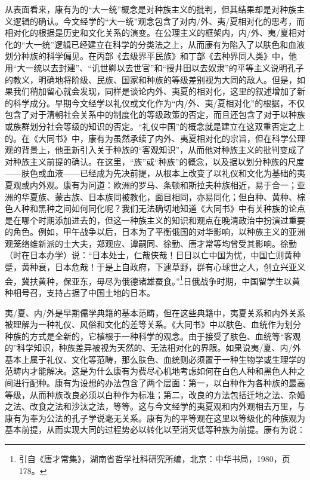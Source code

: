 \documentclass[a4paper, 12pt, openright]{ctexbook}
\begin{document}
从表面看来，康有为的“大一统”概念是对种族主义的批判，但其结果却是对种族主义逻辑的确认。今文经学的“大一统”观念包含了对内/外、夷/夏相对化的思考，而相对化的根据是历史和文化关系的演变。在公理主义的框架内，内/外、夷/夏相对化的“大一统”逻辑已经建立在科学的分类法之上，从而康有为陷入了以肤色和血液划分种族的科学偏见。在丙部《去级界平民族》和丁部《去种界同人类》中，他用“大一统以去封建”、“讥世卿以去世官”和“授井田以去奴隶”的平等主义说明孔子的教义，明确地将阶级、民族、国家和种族的等级差别视为大同的敌人。但是，如果我们稍加留心就会发现，同样是谈论内外、夷夏的相对化，这里的叙述增加了新的科学成分。早期今文经学以礼仪或文化作为“内/外、夷/夏相对化”的根据，不仅包含了对于清朝社会关系中的制度化的等级政策的否定，而且还包含了对于以种族或族群划分社会等级的知识的否定。“礼仪中国”的概念就是建立在这双重否定之上的。在《大同书》中，康有为虽然承续了内外、夷夏相对化的宗旨，但在科学公理观的背景上，他重新引入关于种族的“客观知识”，从而他对种族主义的批判变成了对种族主义前提的确认。在这里，“族”或“种族”的概念，以及据以划分种族的尺度——肤色或血液——已经成为先决前提，从根本上改变了以礼仪和文化为基础的夷夏观或内外观。康有为问道：欧洲的罗马、条顿和斯拉夫种族相近，易于合一；亚洲的华夏族、蒙古族、日本族同被教化，面目相同，亦易同化；但白种、黄种、棕色人种和黑种之间如何同化呢？我们无法确切地知道《大同书》中有关种族的论点是在哪个时期添加进去的，但这一种族主义的知识和观点在晚清政治中扮演过重要的角色。例如，甲午战争以后，日本为了平衡俄国的对华影响，以种族主义的亚洲观笼络维新派的士大夫，郑观应、谭嗣同、徐勤、唐才常等均曾受其影响。徐勤（时在日本办学）说：“日本处士，仁哉侠哉！日日以亡中国为忧，中国亡则黄种蹙，黄种衰，日本危哉！于是上自政府，下逮草野，群有心球世之人，创立兴亚义会，冀扶黄种，保亚东，毋尽为俄德诸雄蚕食。”\footnote{引自《唐才常集》，湖南省哲学社科研究所编，北京：中华书局，1980，页178。}日俄战争时期，中国留学生以黄种相号召，支持占据了中国土地的日本。

夷/夏、内/外是早期儒学典籍的基本范畴，但在这些典籍中，夷夏关系和内外关系被理解为一种礼仪、风俗和文化的差等关系。《大同书》中以肤色、血统作为划分种族的方式是全新的，它植根于一种科学的观念。由于接受了肤色、血统等“客观的”科学知识，种族差异被视为天然的、无法相对化的界限。如果说夷/夏、内/外基本上属于礼仪、文化等范畴，那么肤色、血统则必须置于一种生物学或生理学的范畴内才能解决。这是为什么康有为费尽心机地考虑如何在白色人种和黑色人种之间进行配种。康有为设想的办法包含了两个层面：第一，以白种作为各种族的最高等级，从而种族改良必须以白种作为标准；第二，改良的方法包括迁地之法、杂婚之法、改食之法和沙汰之法，等等。这与今文经学的夷夏观和内外观相去万里，与康有为奉为公法的孔子学说毫无关系。康有为的平等观在这里以等级化的种族观为基本前提，从而实现大同的过程势必以转化以至消灭低等种族为前提。康有为说：
\end{document}
